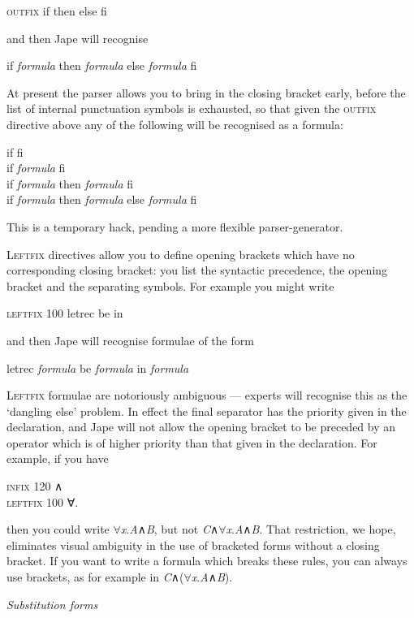 \textsc{outfix} if then else fi


and then Jape will recognise


if \textit{formula} then \textit{formula} else \textit{formula} fi


At present the parser allows you to bring in the closing bracket early, before the list of internal punctuation symbols is exhausted, so that given the \textsc{outfix} directive above any of the following will be recognised as a formula:

if fi\\
if \textit{formula} fi\\
if \textit{formula} then \textit{formula} fi\\
if \textit{formula} then \textit{formula} else \textit{formula} fi


This is a temporary hack, pending a more flexible parser-generator.


\textsc{Leftfix} directives allow you to define opening brackets which have no corresponding closing bracket: you list the syntactic precedence, the opening bracket and the separating symbols. For example you might write


\textsc{leftfix 100} letrec be in


and then Jape will recognise formulae of the form


letrec \textit{formula} be \textit{formula} in \textit{formula}


\textsc{Leftfix} formulae are notoriously ambiguous --- experts will recognise this as the `dangling else' problem. In effect the final separator has the priority given in the declaration, and Jape will not allow the opening bracket to be preceded by an operator which is of higher priority than that given in the declaration. For example, if you have

\textsc{infix 120} \textsc{∧}\\
\textsc{leftfix 100} ∀.


then you could write \ensuremath{\forall}\textit{x}.\textit{A}\textsc{∧}\textit{B}, but not \textit{C}\textsc{∧}\ensuremath{\forall}\textit{x}.\textit{A}\textsc{∧}\textit{B}. That restriction, we hope, eliminates visual ambiguity in the use of bracketed forms without a closing bracket. If you want to write a formula which breaks these rules, you can always use brackets, as for example in \textit{C}\textsc{∧}(\ensuremath{\forall}\textit{x}.\textit{A}\textsc{∧}\textit{B}).


\textit{Substitution forms}


